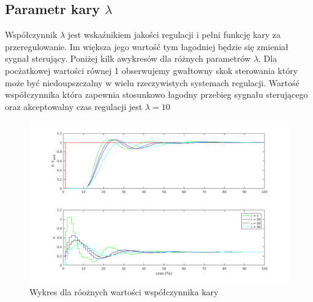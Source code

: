 \documentclass[a4paper, 11pt]{article}
\begin{document}
\subsection{Parametr kary $\lambda$}
Współczynnik $\lambda$ jest wskaźnikiem jakości regulacji i pełni funkcję kary za przeregulowanie. Im większa jego wartość tym łagodniej będzie się zmieniał sygnał sterujący. Poniżej kilk awykresów dla różnych parametrów $\lambda$. Dla pocżatkowej wartości równej 1 obserwujemy gwałtowny skok sterowania który może być niedoupszczalny w wielu rzeczywistych systemach regulacji. Wartość współczynnika która zapewnia stosunkowo łagodny przebieg sygnału sterującego oraz akceptowalny czas regulacji jest $\lambda = 10$
\begin{figure}[H]
\centering
\includegraphics[scale=0.60]{lambda_dmc.png}
\caption{Wykres dla róożnych wartości współczynnika kary}
\label{}
\end{figure}



 
 

 
 
\end{document}
